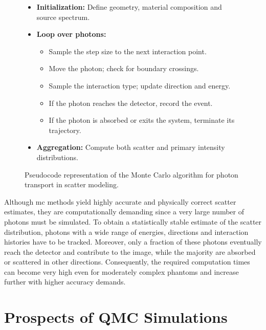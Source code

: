 \begin{figure}[H]
\centering
\begin{tcolorbox}[colback=white!95!gray, colframe=black!60, width=0.9\textwidth, title=Monte Carlo Photon Transport Algorithm, fonttitle=\bfseries]
\begin{itemize}[leftmargin=1.5em]
    \item \textbf{Initialization:} Define geometry, material composition and source
    spectrum.
    
    \item \textbf{Loop over photons:}
    \begin{itemize}
        \item Sample the step size to the next interaction point.
        \item Move the photon; check for boundary crossings.
        \item Sample the interaction type; update direction and energy.
        \item If the photon reaches the detector, record the event.
        \item If the photon is absorbed or exits the system, terminate its trajectory.
    \end{itemize}
    
    \item \textbf{Aggregation:} Compute both scatter and primary intensity distributions.
\end{itemize}
\end{tcolorbox}
\caption{Pseudocode representation of the Monte Carlo algorithm for photon transport in scatter modeling.}
\label{fig:photon-transport-pseudocode}
\end{figure}

Although \ac{mc} methods yield highly accurate and physically correct scatter
estimates, they are computationally demanding since a very large number of
photons must be simulated. To obtain a statistically stable estimate of the
scatter distribution, photons with a wide range of energies, directions and
interaction histories have to be tracked. Moreover, only a fraction of these
photons eventually reach the detector and contribute to the image, while the
majority are absorbed or scattered in other directions. Consequently, the
required computation times can become very high even for moderately complex
phantoms and increase further with higher accuracy demands.


\section{Prospects of QMC Simulations}

